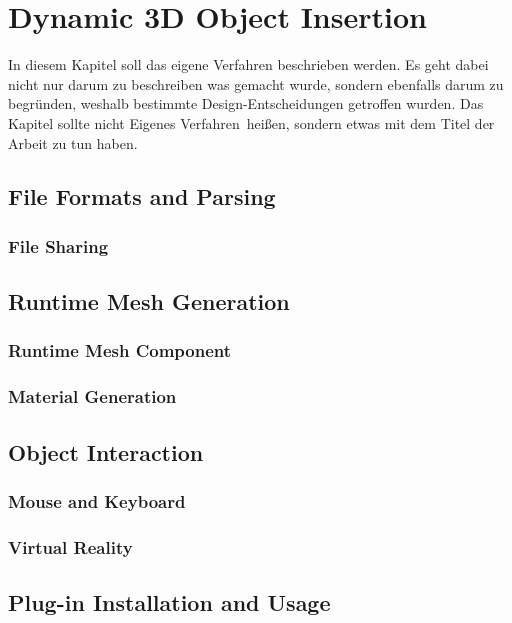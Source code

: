 \chapter{Dynamic 3D Object Insertion}\label{chp:ObjectLoading}
In diesem Kapitel soll das eigene Verfahren beschrieben werden. Es geht dabei nicht nur darum zu beschreiben was gemacht wurde, sondern ebenfalls darum zu begründen, weshalb bestimmte Design-Entscheidungen getroffen wurden. Das Kapitel sollte nicht \glqq Eigenes Verfahren\grqq \ heißen, sondern etwas mit dem Titel der Arbeit zu tun haben.

\section{File Formats and Parsing}


\subsection{File Sharing}

\section{Runtime Mesh Generation}
\subsection{Runtime Mesh Component}
\subsection{Material Generation}
\section{Object Interaction}\label{chp:ObjectInteraction}

\subsection{Mouse and Keyboard}

\subsection{Virtual Reality}

\section{Plug-in Installation and Usage}



